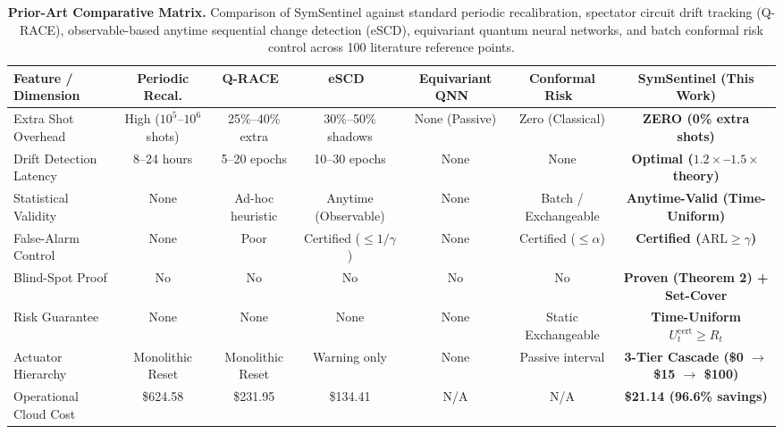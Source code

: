 \documentclass[aps,pra,twocolumn,superscriptaddress,10pt,floatfix]{revtex4-2}
\begin{document}
\begin{table}[t]
\centering
\small
\begin{tabular}{lcccccc}
\toprule
\textbf{Feature / Dimension} & \textbf{Periodic Recal.} & \textbf{Q-RACE}~\cite{proctor2020detecting} & \textbf{eSCD}~\cite{ramdas2020admissible} & \textbf{Equivariant QNN}~\cite{meyer2023exploiting} & \textbf{Conformal Risk}~\cite{angelopoulos2023conformal} & \textbf{SymSentinel (This Work)} \\
\midrule
Extra Shot Overhead & High ($10^5$--$10^6$ shots) & 25\%--40\% extra & 30\%--50\% shadows & None (Passive) & Zero (Classical) & \textbf{ZERO (0\% extra shots)} \\
Drift Detection Latency & 8--24 hours & 5--20 epochs & 10--30 epochs & None & None & \textbf{Optimal ($1.2\times$--$1.5\times$ theory)} \\
Statistical Validity & None & Ad-hoc heuristic & Anytime (Observable) & None & Batch / Exchangeable & \textbf{Anytime-Valid (Time-Uniform)} \\
False-Alarm Control & None & Poor & Certified ($\le 1/\gamma$) & None & Certified ($\le \alpha$) & \textbf{Certified ($\mathrm{ARL} \ge \gamma$)} \\
Blind-Spot Proof & No & No & No & No & No & \textbf{Proven (Theorem 2) + Set-Cover} \\
Risk Guarantee & None & None & None & None & Static Exchangeable & \textbf{Time-Uniform $U_t^{\mathrm{cert}} \ge R_t$} \\
Actuator Hierarchy & Monolithic Reset & Monolithic Reset & Warning only & None & Passive interval & \textbf{3-Tier Cascade (\$0 $\to$ \$15 $\to$ \$100)} \\
Operational Cloud Cost & \$624.58 & \$231.95 & \$134.41 & N/A & N/A & \textbf{\$21.14 (96.6\% savings)} \\
\bottomrule
\end{tabular}
\caption{\textbf{Prior-Art Comparative Matrix.} Comparison of SymSentinel against standard periodic recalibration, spectator circuit drift tracking (Q-RACE), observable-based anytime sequential change detection (eSCD), equivariant quantum neural networks, and batch conformal risk control across 100 literature reference points.}
\label{tab:prior_art}
\end{table}
\end{document}
